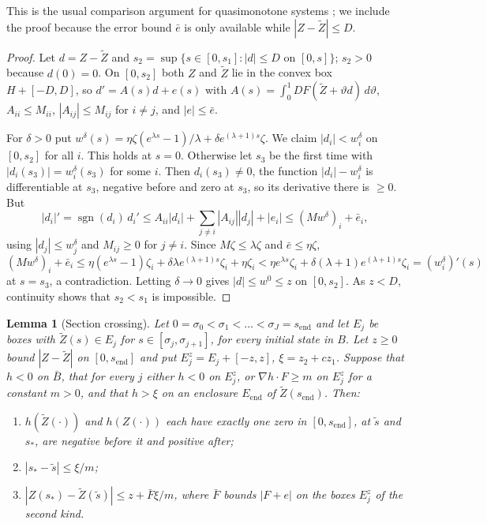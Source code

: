 \documentclass[12pt,reqno]{amsart}
\numberwithin{equation}{section}
\theoremstyle{plain}
\newtheorem{lemma}[theorem]{Lemma}
\theoremstyle{definition}
\theoremstyle{remark}
\newcommand{\send}{s_{\mathrm{end}}}
\begin{document}
This is the usual comparison argument for quasimonotone systems
\cite{Wal70}; we include the proof because the error bound $\bar e$ is
only available while $|Z-\tilde Z|\le D$.

\begin{proof}
Let $d=Z-\tilde Z$ and $s_2=\sup\{s\in[0,s_1]:|d|\le D\text{ on }[0,s]\}$; $s_2>0$
because $d(0)=0$. On $[0,s_2]$ both $Z$ and $\tilde Z$ lie in the convex box
$H+[-D,D]$, so $d'=A(s)d+e(s)$ with $A(s)=\int_0^1DF(\tilde Z+\vartheta d)\,d\vartheta$,
$A_{ii}\le M_{ii}$, $|A_{ij}|\le M_{ij}$ for $i\ne j$, and $|e|\le\bar e$.

For $\delta>0$ put $w^\delta(s)=\eta\zeta(e^{\lambda s}-1)/\lambda+\delta e^{(\lambda+1)s}\zeta$. We claim
$|d_i|<w^\delta_i$ on $[0,s_2]$ for all $i$. This holds at $s=0$. Otherwise
let $s_3$ be the first time with $|d_i(s_3)|=w^\delta_i(s_3)$ for some $i$. Then
$d_i(s_3)\ne0$, the function $|d_i|-w^\delta_i$ is differentiable at $s_3$,
negative before and zero at $s_3$, so its derivative there is $\ge0$. But
\[
  |d_i|'=\operatorname{sgn}(d_i)\,d_i'\le A_{ii}|d_i|+\sum_{j\ne i}|A_{ij}||d_j|+|e_i|
  \le(Mw^\delta)_i+\bar e_i,
\]
using $|d_j|\le w^\delta_j$ and $M_{ij}\ge0$ for $j\ne i$. Since $M\zeta\le\lambda\zeta$ and
$\bar e\le\eta\zeta$,
\[
  (Mw^\delta)_i+\bar e_i\le\eta(e^{\lambda s}-1)\zeta_i+\delta\lambda e^{(\lambda+1)s}\zeta_i+\eta\zeta_i
  <\eta e^{\lambda s}\zeta_i+\delta(\lambda+1)e^{(\lambda+1)s}\zeta_i=(w^\delta_i)'(s)
\]
at $s=s_3$, a contradiction. Letting $\delta\to0$ gives $|d|\le w^0\le z$ on $[0,s_2]$.
As $z<D$, continuity shows that $s_2<s_1$ is impossible.
\end{proof}

\begin{lemma}[Section crossing]\label{lem:section}
Let $0=\sigma_0<\sigma_1<\dots<\sigma_J=\send$ and let $E_j$ be boxes with
$\tilde Z(s)\in E_j$ for $s\in[\sigma_j,\sigma_{j+1}]$, for every initial state in $B$.
Let $z\ge0$ bound $|Z-\tilde Z|$ on $[0,\send]$ and put $E_j^z=E_j+[-z,z]$,
$\xi=z_2+cz_1$. Suppose that $h<0$ on $\bar B$, that for every $j$ either $h<0$ on $E_j^z$, or
$\nabla h\cdot F\ge m$ on $E_j^z$ for a constant $m>0$, and that $h>\xi$ on an
enclosure $E_{\mathrm{end}}$ of $\tilde Z(\send)$. Then:
\begin{enumerate}[label=\textup{(\alph*)}]
\item $h(\tilde Z(\cdot))$ and $h(Z(\cdot))$ each have exactly one zero in
  $[0,\send]$, at $\tilde s$ and $s_*$, are negative before it and positive after;
\item $|s_*-\tilde s|\le\xi/m$;
\item $|Z(s_*)-\tilde Z(\tilde s)|\le z+\bar F\xi/m$, where $\bar F$ bounds $|F+e|$ on
  the boxes $E_j^z$ of the second kind.
\end{enumerate}
\end{lemma}
\end{document}
